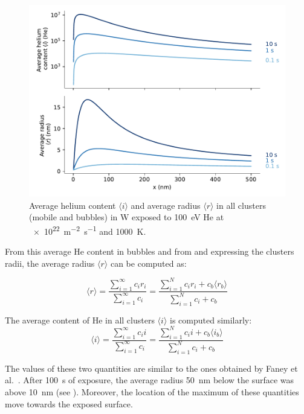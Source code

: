 \begin{figure}
    \centering
    \includegraphics[width=0.75\linewidth]{Figures/Chapter4/half_slab/average_content_radius.pdf}
    \caption{Average helium content $\langle i \rangle$ and average radius $\langle r \rangle$ in all clusters (mobile and bubbles) in \gls{W} exposed to \SI{100}{eV} \gls{He} at \SI{e22}{m^{-2}.s^{-1}} and \SI{1000}{K}.}
\end{figure}

From this average \gls{He} content in bubbles and from  and  expressing the clusters radii, the average radius $\langle r \rangle$ can be computed as:

\begin{equation}
        \langle r \rangle = \frac{\sum\limits_{i=1}^\infty c_i r_i}{\sum\limits_{i=1}^\infty c_i}
        = \frac{\sum\limits_{i=1}^N c_i r_i + c_b \langle r_b \rangle }{\sum\limits_{i=1}^N c_i + c_b}
\end{equation}

The average content of \gls{He} in all clusters $\langle i \rangle$ is computed similarly:
\begin{equation}
        \langle i \rangle = \frac{\sum\limits_{i=1}^\infty c_i i}{\sum\limits_{i=1}^\infty c_i}
        = \frac{\sum\limits_{i=1}^N c_i i + c_b \langle i_b \rangle }{\sum\limits_{i=1}^N c_i + c_b}
\end{equation}

The values of these two quantities are similar to the ones obtained by Faney et al.\ .
After \SI{100}{s} of exposure, the average radius \SI{50}{nm} below the surface was above \SI{10}{nm} (see ).
Moreover, the location of the maximum of these quantities move towards the exposed surface.

